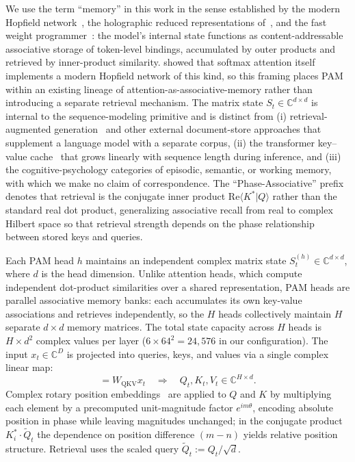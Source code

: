 \documentclass[aps,prl,twocolumn,superscriptaddress,amsmath,amssymb]{revtex4-2}
\newcommand{\Complex}{\mathbb{C}}
\begin{document}
We use the term ``memory'' in this work in the sense established by the modern Hopfield network~\cite{ramsauer2021hopfield,hopfield1982neural,krotov2016dense}, the holographic reduced representations of~\citet{plate1995holographic}, and the fast weight programmer~\cite{schmidhuber1992learning,schlag2021linear}: the model's internal state functions as content-addressable associative storage of token-level bindings, accumulated by outer products and retrieved by inner-product similarity. \citet{ramsauer2021hopfield} showed that softmax attention itself implements a modern Hopfield network of this kind, so this framing places PAM within an existing lineage of attention-as-associative-memory rather than introducing a separate retrieval mechanism. The matrix state $S_t \in \Complex^{d \times d}$ is internal to the sequence-modeling primitive and is distinct from (i) retrieval-augmented generation~\cite{lewis2020retrieval} and other external document-store approaches that supplement a language model with a separate corpus, (ii) the transformer key--value cache~\cite{vaswani2017attention} that grows linearly with sequence length during inference, and (iii) the cognitive-psychology categories of episodic, semantic, or working memory, with which we make no claim of correspondence. The ``Phase-Associative'' prefix denotes that retrieval is the conjugate inner product $\mathrm{Re}\langle K^* | Q\rangle$ rather than the standard real dot product, generalizing associative recall from real to complex Hilbert space so that retrieval strength depends on the phase relationship between stored keys and queries.

Each PAM head $h$ maintains an independent complex matrix state $S_t^{(h)} \in \Complex^{d \times d}$, where $d$ is the head dimension. Unlike attention heads, which compute independent dot-product similarities over a shared representation, PAM heads are parallel associative memory banks: each accumulates its own key-value associations and retrieves independently, so the $H$ heads collectively maintain $H$ separate $d \times d$ memory matrices. The total state capacity across $H$ heads is $H \times d^2$ complex values per layer ($6 \times 64^2 = 24{,}576$ in our configuration). The input $x_t \in \Complex^D$ is projected into queries, keys, and values via a single complex linear map:
\begin{equation}
  [Q_t; K_t; V_t] = W_{\text{QKV}} x_t \quad \Rightarrow \quad Q_t, K_t, V_t \in \Complex^{H \times d} .
\end{equation}
Complex rotary position embeddings~\cite{su2024roformer} are applied to $Q$ and $K$ by multiplying each element by a precomputed unit-magnitude factor $e^{i m \theta}$, encoding absolute position in phase while leaving magnitudes unchanged; in the conjugate product $K_i^* \cdot \tilde{Q}_t$ the dependence on position difference $(m{-}n)$ yields relative position structure. Retrieval uses the scaled query $\tilde{Q}_t := Q_t / \sqrt{d}$.
\end{document}
